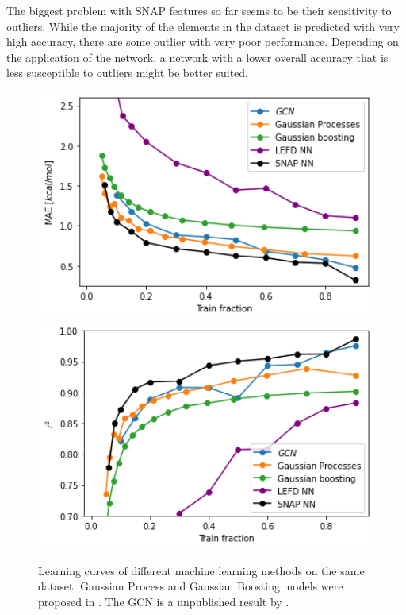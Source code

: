 The biggest problem with SNAP features so far seems to be their sensitivity to outliers.
While the majority of the elements in the dataset is predicted with very high accuracy, 
there are some outlier with very poor performance.
Depending on the application of the network, a network with a lower overall accuracy 
that is less susceptible to outliers might be better suited.

\begin{figure}[!htb]
    \includegraphics[width=1.0\textwidth]{figures/regression/mae-compare.png}
  \endminipage\hfill
  \includegraphics[width=1.0\textwidth]{figures/regression/r2-compare.png}
  \endminipage\hfill  
  \caption[Comparison of learning curves]{
    Learning curves of different machine learning methods on the same dataset.
    Gaussian Process and Gaussian Boosting models were proposed in \cite{friederich_dos}.
    The GCN is a unpublished result by \citeauthor{friederich_dos}.
  }
  \label{fig:snap_roation}

\end{figure}



